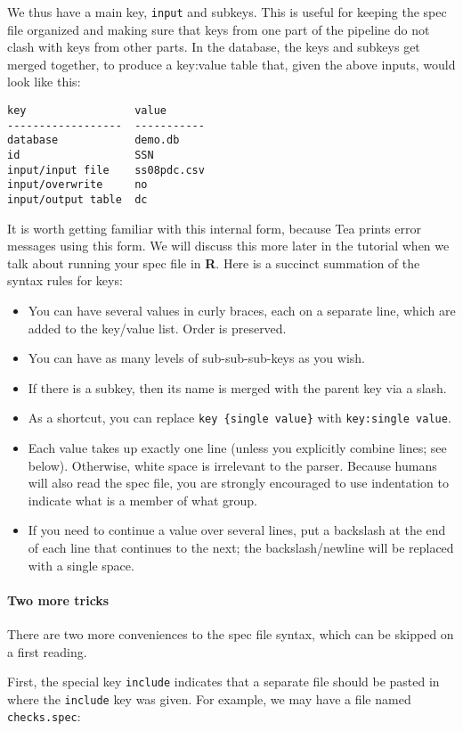 \documentclass{article}
\begin{document}
We thus have a main key, {\tt input} and subkeys.  This is useful for keeping the spec
file organized and making sure that keys from one part of the pipeline do not clash with
keys from other parts.  In the database, the keys and subkeys get merged together,
to produce a key:value table that, given the above inputs, would look like this:

\begin{verbatim}
key                 value
------------------  -----------
database            demo.db
id                  SSN
input/input file    ss08pdc.csv
input/overwrite     no
input/output table  dc
\end{verbatim}

It is worth getting familiar with this internal form, because Tea prints error messages
using this form.  We will discuss this more later in the tutorial when we talk about
running your spec file in \textbf{R}.  Here is a succinct summation of the syntax
rules for keys:

\begin{itemize}
\item You can have several values in curly braces, each on a separate line, which are added to the key/value list. Order is preserved.
\item You can have as many levels of sub-sub-sub-keys as you wish.
\item If there is a subkey, then its name is merged with the parent key via a slash.
\item As a shortcut, you can replace {\tt key \{single value\}} with {\tt key:single value}.
\item Each value takes up exactly one line (unless you explicitly combine lines; see below). Otherwise, white
space is irrelevant to the parser. Because humans will also read the spec file, you
are strongly encouraged to use indentation to indicate what is a member of what group.
\item If you need to continue a value over several lines, put a backslash at the end of
each line that continues to the next; the backslash/newline will be replaced with a single space.
\end{itemize}

\paragraph{Two more tricks} There are two more conveniences to the spec file syntax,
which can be skipped on a first reading.

First, the special key {\tt include} indicates that a separate file should be pasted in
where the {\tt include} key was given. For example, we may have a file named {\tt
checks.spec}:
\end{document}

